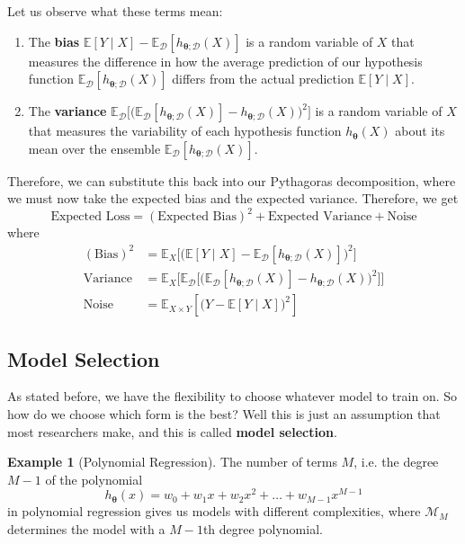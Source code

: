 \documentclass{article}
\theoremstyle{definition}
\newtheorem{example}{Example}[section]
\begin{document}
    Let us observe what these terms mean: 
    \begin{enumerate}
        \item The \textbf{bias} $\mathbb{E}[Y \mid X] - \mathbb{E}_\mathcal{D} [h_{{\boldsymbol{\theta}}; \mathcal{D}} (X)]$ is a random variable of $X$ that measures the difference in how the average prediction of our hypothesis function $\mathbb{E}_\mathcal{D} [h_{{\boldsymbol{\theta}}; \mathcal{D}} (X)]$ differs from the actual prediction $\mathbb{E}[Y \mid X]$. 

        \item The \textbf{variance} $\mathbb{E}_\mathcal{D} \big[ \big( \mathbb{E}_\mathcal{D} [h_{{\boldsymbol{\theta}}; \mathcal{D}} (X)] - h_{{\boldsymbol{\theta}}; \mathcal{D}} (X) \big)^2 \big]$ is a random variable of $X$ that measures the variability of each hypothesis function $h_{\boldsymbol{\theta}}(X)$ about its mean over the ensemble $\mathbb{E}_\mathcal{D} [h_{{\boldsymbol{\theta}}; \mathcal{D}} (X)]$. 
    \end{enumerate}
    Therefore, we can substitute this back into our Pythagoras decomposition, where we must now take the expected bias and the expected variance. Therefore, we get 
    \[\text{Expected Loss} = (\text{Expected Bias})^2 + \text{Expected Variance} + \text{Noise}\]
    where 
    \begin{align*}
        (\text{Bias})^2 & = \mathbb{E}_X \big[ \big( \mathbb{E}[Y \mid X] - \mathbb{E}_\mathcal{D} [h_{{\boldsymbol{\theta}}; \mathcal{D}} (X)] \big)^2 \big] \\
        \text{Variance} & = \mathbb{E}_X \big[ \mathbb{E}_\mathcal{D} \big[ \big( \mathbb{E}_\mathcal{D} [h_{{\boldsymbol{\theta}}; \mathcal{D}} (X)] - h_{\boldsymbol{\theta}; \mathcal{D}}(X) \big)^2 \big] \big] \\
        \text{Noise} & = \mathbb{E}_{X \times Y}[\big(Y - \mathbb{E}[Y \mid X]\big)^2]
    \end{align*}

  \subsection{Model Selection}

    As stated before, we have the flexibility to choose whatever model to train on. So how do we choose which form is the best? Well this is just an assumption that most researchers make, and this is called \textbf{model selection}. 

    \begin{example}[Polynomial Regression]
    The number of terms $M$, i.e. the degree $M-1$ of the polynomial 
    \[h_{\boldsymbol{\theta}} (x) = w_0 + w_1 x + w_2 x^2 + \ldots + w_{M-1} x^{M-1}\]
    in polynomial regression gives us models with different complexities, where $\mathcal{M}_M$ determines the model with a $M-1$th degree polynomial. 
    \end{example}
\end{document}
